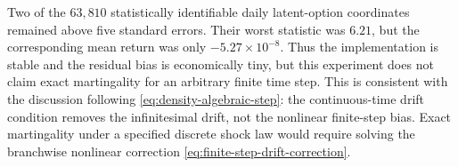 \documentclass[11pt]{article}
\theoremstyle{plain}
\theoremstyle{definition}
\theoremstyle{remark}
\begin{document}
Two of the $63{,}810$ statistically identifiable daily latent-option
coordinates remained above five standard errors.  Their worst statistic was
$6.21$, but the corresponding mean return was only $-5.27\times10^{-8}$.
Thus the implementation is stable and the residual bias is economically tiny,
but this experiment does not claim exact martingality for an arbitrary finite
time step.  This is consistent with the discussion following
\eqref{eq:density-algebraic-step}: the continuous-time drift condition removes
the infinitesimal drift, not the nonlinear finite-step bias.  Exact
martingality under a specified discrete shock law would require solving the
branchwise nonlinear correction
\eqref{eq:finite-step-drift-correction}.

\clearpage
\appendix

\clearpage




\end{document}
